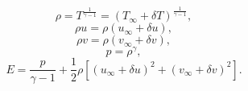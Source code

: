 \begin{equation}
    \label{eq_vortex_analytical_3}
	\rho = T^{\frac{1}{\gamma-1}} = {(T_{\infty} + \delta T)}^{\frac{1}{\gamma-1}},
\end{equation}
%
\begin{equation}
    \label{eq_vortex_analytical_4}
	\rho u = \rho (u_{\infty} + \delta u),
\end{equation}
%
\begin{equation}
    \label{eq_vortex_analytical_5}
	\rho v = \rho (v_{\infty} + \delta v),
\end{equation}
%
\begin{equation}
    \label{eq_vortex_analytical_6}
	p = \rho^{\gamma},
\end{equation}
%
\begin{equation}
    \label{eq_vortex_analytical_7}
	E = \frac{p}{\gamma-1} + \frac{1}{2}\rho [{(u_{\infty} + \delta u)}^2 + {(v_{\infty} + \delta v)}^2].
\end{equation}

